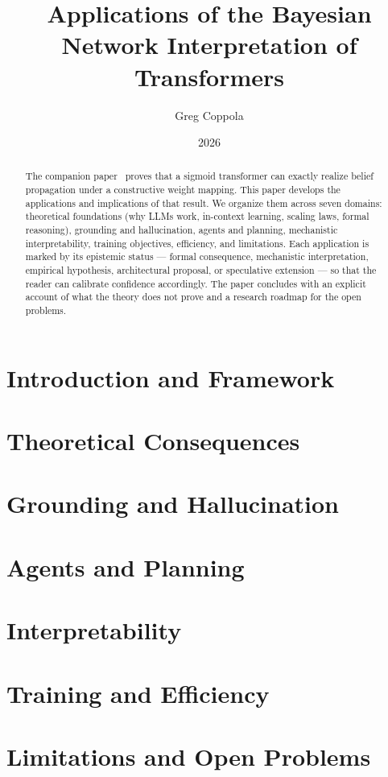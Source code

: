 \documentclass[11pt]{article}
\title{Applications of the Bayesian Network Interpretation of Transformers}
\author{Greg Coppola}
\date{2026}
\begin{document}
\maketitle
\begin{abstract}
The companion paper~\cite{coppola2026transformers} proves that a sigmoid
transformer can exactly realize belief propagation under a constructive
weight mapping. This paper develops the applications and implications of
that result. We organize them across seven domains: theoretical foundations
(why LLMs work, in-context learning, scaling laws, formal reasoning),
grounding and hallucination, agents and planning, mechanistic
interpretability, training objectives, efficiency, and limitations. Each
application is marked by its epistemic status --- formal consequence,
mechanistic interpretation, empirical hypothesis, architectural proposal,
or speculative extension --- so that the reader can calibrate confidence
accordingly. The paper concludes with an explicit account of what the
theory does not prove and a research roadmap for the open problems.
\end{abstract}
\tableofcontents
\newpage
\part{Introduction and Framework}

\part{Theoretical Consequences}




\part{Grounding and Hallucination}


\part{Agents and Planning}



\part{Interpretability}


\part{Training and Efficiency}


\part{Limitations and Open Problems}




\end{document}
